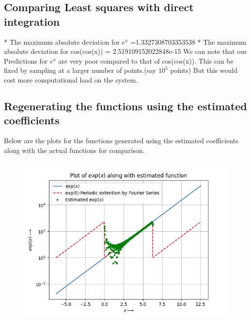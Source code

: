 \documentclass{article}
\begin{document}
\clearpage
\subsection{Comparing Least squares with direct integration}
* The maximum absolute deviation for $e^x$ =1.3327308703353538\newline
* The maximum absolute deviation for cos(cos(x)) = 2.519109152022848e-15\newline
We can note that our Predictions for $e^x$ are very poor compared to that of cos(cos(x)). This can be fixed by sampling at a larger number of points.(say $10^5$ points)\newline 
But this would cost more computational load on the system.

\subsection{Regenerating the functions using the estimated coefficients}
Below are the plots for the functions generated using the estimated coefficients along with the actual functions for comparison.
\begin{figure}[h!]
    \centering
    \includegraphics[scale=0.7]{exp_estim.png}
    \label{fig:1(b)}
\end{figure}
\end{document}
